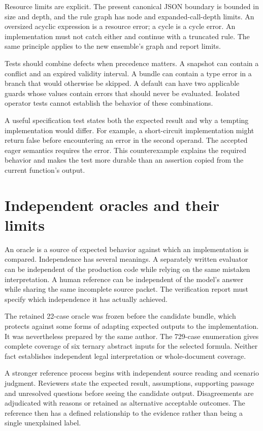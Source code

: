 \documentclass[12pt,a4paper,oneside,openany]{book}
\begin{document}
Resource limits are explicit. The present canonical JSON boundary is bounded in
size and depth, and the rule graph has node and expanded-call-depth limits. An
oversized acyclic expression is a resource error; a cycle is a cycle error. An
implementation must not catch either and continue with a truncated rule. The
same principle applies to the new ensemble's graph and report limits.

Tests should combine defects when precedence matters. A snapshot can contain a
conflict and an expired validity interval. A bundle can contain a type error in a
branch that would otherwise be skipped. A default can have two applicable guards
whose values contain errors that should never be evaluated. Isolated operator
tests cannot establish the behavior of these combinations.

A useful specification test states both the expected result and why a tempting
implementation would differ. For example, a short-circuit implementation might
return false before encountering an error in the second operand. The accepted
eager semantics requires the error. This counterexample explains the required behavior and
makes the test more durable than an assertion copied from the current function's
output.

\section{Independent oracles and their limits}
\label{merge:M07:05}


An oracle is a source of expected behavior against which an implementation is
compared. Independence has several meanings. A separately written evaluator can
be independent of the production code while relying on the same mistaken
interpretation. A human reference can be independent of the model's answer while
sharing the same incomplete source packet. The verification report must specify
which independence it has actually achieved.

The retained 22-case oracle was frozen before the candidate bundle, which protects
against some forms of adapting expected outputs to the implementation. It was
nevertheless prepared by the same author. The 729-case enumeration gives complete
coverage of six ternary abstract inputs for the selected formula. Neither fact
establishes independent legal interpretation or whole-document coverage.

A stronger reference process begins with independent source reading and scenario
judgment. Reviewers state the expected result, assumptions, supporting passage
and unresolved questions before seeing the candidate output. Disagreements are
adjudicated with reasons or retained as alternative acceptable outcomes. The
reference then has a defined relationship to the evidence rather than being a
single unexplained label.
\end{document}
